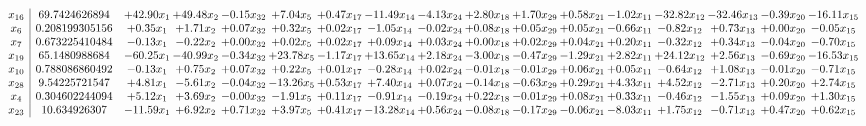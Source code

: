 \documentclass[9pt]{article}
\begin{document}
 \[\begin{array}{c| c c@{\hskip 2pt} c@{\hskip 2pt} c@{\hskip 2pt} c@{\hskip 2pt} c@{\hskip 2pt} c@{\hskip 2pt} c@{\hskip 2pt} c@{\hskip 2pt} c@{\hskip 2pt} c@{\hskip 2pt} c@{\hskip 2pt} c@{\hskip 2pt} c@{\hskip 2pt} c@{\hskip 2pt} c@{\hskip 2pt} }
 x_{16}   &  69.7424626894 & + 42.90 x_{1} & + 49.48 x_{2} & -0.15 x_{32} & +  7.04 x_{5} & +  0.47 x_{17} & -11.49 x_{14} & -4.13 x_{24} & +  2.80 x_{18} & +  1.70 x_{29} & +  0.58 x_{21} & -1.02 x_{11} & -32.82 x_{12} & -32.46 x_{13} & -0.39 x_{20} & -16.11 x_{15}\\
 x_{6}   &  0.208199305156 & +  0.35 x_{1} & +  1.71 x_{2} & +  0.07 x_{32} & +  0.32 x_{5} & +  0.02 x_{17} & -1.05 x_{14} & -0.02 x_{24} & +  0.08 x_{18} & +  0.05 x_{29} & +  0.05 x_{21} & -0.66 x_{11} & -0.82 x_{12} & +  0.73 x_{13} & +  0.00 x_{20} & -0.05 x_{15}\\
 x_{7}   &  0.673225410484 & -0.13 x_{1} & -0.22 x_{2} & +  0.00 x_{32} & +  0.02 x_{5} & +  0.02 x_{17} & +  0.09 x_{14} & +  0.03 x_{24} & +  0.00 x_{18} & +  0.02 x_{29} & +  0.04 x_{21} & +  0.20 x_{11} & -0.32 x_{12} & +  0.34 x_{13} & -0.04 x_{20} & -0.70 x_{15}\\
 x_{19}   &  65.1480988684 & -60.25 x_{1} & -40.99 x_{2} & -0.34 x_{32} & + 23.78 x_{5} & -1.17 x_{17} & + 13.65 x_{14} & +  2.18 x_{24} & -3.00 x_{18} & -0.47 x_{29} & -1.29 x_{21} & +  2.82 x_{11} & + 24.12 x_{12} & +  2.56 x_{13} & -0.69 x_{20} & -16.53 x_{15}\\
 x_{10}   &  0.788086860492 & -0.13 x_{1} & +  0.75 x_{2} & +  0.07 x_{32} & +  0.22 x_{5} & +  0.01 x_{17} & -0.28 x_{14} & +  0.02 x_{24} & -0.01 x_{18} & -0.01 x_{29} & +  0.06 x_{21} & +  0.05 x_{11} & -0.64 x_{12} & +  1.08 x_{13} & -0.01 x_{20} & -0.71 x_{15}\\
 x_{28}   &  9.54225721547 & +  4.81 x_{1} & -5.61 x_{2} & -0.04 x_{32} & -13.26 x_{5} & +  0.53 x_{17} & +  7.40 x_{14} & +  0.07 x_{24} & -0.14 x_{18} & -0.63 x_{29} & +  0.29 x_{21} & +  4.33 x_{11} & +  4.52 x_{12} & -2.71 x_{13} & +  0.20 x_{20} & +  2.74 x_{15}\\
 x_{4}   &  0.304602244094 & +  5.12 x_{1} & +  3.69 x_{2} & -0.00 x_{32} & -1.91 x_{5} & +  0.11 x_{17} & -0.91 x_{14} & -0.19 x_{24} & +  0.22 x_{18} & -0.01 x_{29} & +  0.08 x_{21} & +  0.33 x_{11} & -0.46 x_{12} & -1.55 x_{13} & +  0.09 x_{20} & +  1.30 x_{15}\\
 x_{23}   &  10.634926307 & -11.59 x_{1} & +  6.92 x_{2} & +  0.71 x_{32} & +  3.97 x_{5} & +  0.41 x_{17} & -13.28 x_{14} & +  0.56 x_{24} & -0.08 x_{18} & -0.17 x_{29} & -0.06 x_{21} & -8.03 x_{11} & +  1.75 x_{12} & -0.71 x_{13} & +  0.47 x_{20} & +  0.62 x_{15}\\

\end{array}\]
\end{document}
